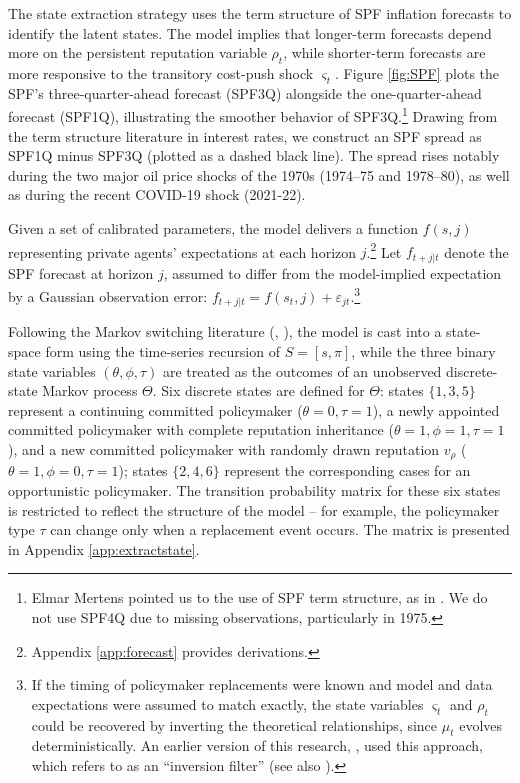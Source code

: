 \documentclass[12pt,letter,leqno]{article}
\theoremstyle{asn}
\theoremstyle{lem}
\theoremstyle{slem}
\theoremstyle{prop}
\theoremstyle{appprop}
\theoremstyle{rem}
\theoremstyle{defn}
\begin{document}
The state extraction strategy uses the term structure of SPF inflation forecasts to identify the latent states. The model implies that longer-term forecasts depend more on the persistent reputation variable $\rho_t$, while shorter-term forecasts are more responsive to the transitory cost-push shock $\varsigma_t$. Figure \ref{fig:SPF} plots the SPF’s three-quarter-ahead forecast (SPF3Q) alongside the one-quarter-ahead forecast (SPF1Q), illustrating the smoother behavior of SPF3Q.\footnote{Elmar Mertens pointed us to the use of SPF term structure, as in \cite{mertens_inflation_2020}. We do not use SPF4Q due to missing observations, particularly in 1975.} Drawing from the term structure literature in interest rates, we construct an SPF spread as SPF1Q minus SPF3Q (plotted as a dashed black line). The spread rises notably during the two major oil price shocks of the 1970s (1974–75 and 1978–80), as well as during the recent COVID-19 shock (2021-22).


Given a set of calibrated parameters, the model delivers a function $f(s, j)$ representing private agents’ expectations at each horizon $j$.\footnote{Appendix \ref{app:forecast} provides derivations.} Let $f_{t+j|t}$ denote the SPF forecast at horizon $j$, assumed to differ from the model-implied expectation by a Gaussian observation error: $f_{t+j|t}=f(s_t,j)+\varepsilon_{jt}$.\footnote{If the timing of policymaker replacements were known and model and data expectations were assumed to match exactly, the state variables $\varsigma_t$ and $\rho_t$ could be recovered by inverting the theoretical relationships, since $\mu_t$ evolves deterministically. An earlier version of this research, \cite{king_evolving_2022}, used this approach, which \cite{kollmann_tractable_2017} refers to as an “inversion filter” (see also \cite{drautzburg_filtering_2022}).}

Following the Markov switching literature (\cite{hamilton_new_1989}, \cite{kim_dynamic_1994}), the model is cast into a state-space form using the time-series recursion of $S = [s, \pi]$, while the three binary state variables $(\theta, \phi, \tau)$ are treated as the outcomes of an unobserved discrete-state Markov process $\Theta$. Six discrete states are defined for $\Theta$: states $\{1, 3, 5\}$ represent a continuing committed policymaker ($\theta = 0, \tau = 1$), a newly appointed committed policymaker with complete reputation inheritance ($\theta = 1, \phi = 1, \tau = 1$), and a new committed policymaker with randomly drawn reputation $v_\rho$ ($\theta = 1, \phi = 0, \tau = 1$); states $\{2, 4, 6\}$ represent the corresponding cases for an opportunistic policymaker. The transition probability matrix for these six states is restricted to reflect the structure of the model -- for example, the policymaker type $\tau$ can change only when a replacement event occurs. The matrix is presented in Appendix \ref{app:extractstate}.
\end{document}
